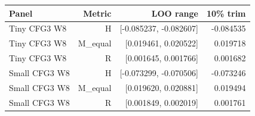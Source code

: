 {\small\setlength{\tabcolsep}{3pt}
\begin{tabular}{lrrr}
\hline
Panel & Metric & LOO range & 10\% trim \\
\hline
Tiny CFG3 W8 & H & [-0.085237, -0.082607] & -0.084535 \\
Tiny CFG3 W8 & M\_equal & [0.019461, 0.020522] & 0.019718 \\
Tiny CFG3 W8 & R & [0.001645, 0.001766] & 0.001682 \\
Small CFG3 W8 & H & [-0.073299, -0.070506] & -0.073246 \\
Small CFG3 W8 & M\_equal & [0.019620, 0.020881] & 0.019494 \\
Small CFG3 W8 & R & [0.001849, 0.002019] & 0.001761 \\
\hline
\end{tabular}
}
